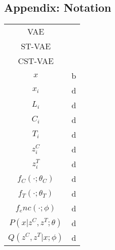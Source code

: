 
\subsection*{Appendix: Notation}


\begin{tabular}{cc}
VAE & \\
ST-VAE & \\
CST-VAE & \\
$x$ & b \\
 $x_i$ & d \\
  $L_i$ & d \\
   $C_i$ & d \\
   $T_i$ & d \\
$z^C_i$ & d \\
$z^T_i$ & d \\
$f_C(\cdot; \theta_C)$ & d \\
$f_T(\cdot; \theta_T)$ & d \\
$f_enc(\cdot ;\phi)$ & d \\
$P(x | z^C, z^T; \theta)$ & d \\
$Q(z^C, z^T | x; \phi)$ & d 
\end{tabular}

